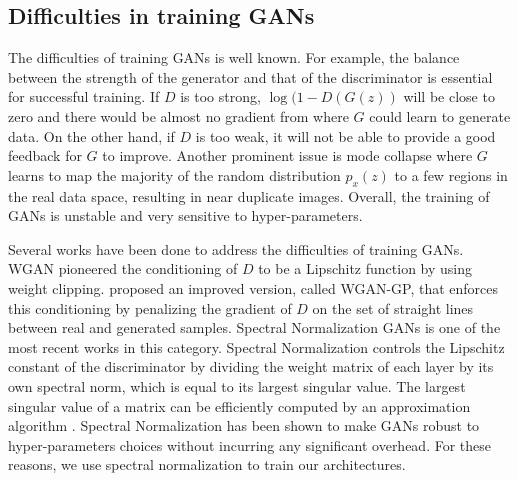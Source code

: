 \documentclass{article} %
\begin{document}
\subsection{Difficulties in training GANs}
The difficulties of training GANs is well known. For example, the balance between the strength of the generator and that of the discriminator is essential for successful training. If $D$ is too strong, $\log{(1-D(G(z))}$ will be close to zero and there would be almost no gradient from where $G$ could learn to generate data. On the other hand, if $D$ is too weak, it will not be able to provide a good feedback for $G$ to improve. Another prominent issue is mode collapse where $G$ learns to map the majority of the random distribution $p_{x}(z)$ to a few regions in the real data space, resulting in near duplicate images. Overall, the training of GANs is unstable and very sensitive to hyper-parameters. \par
Several works have been done to address the difficulties of training GANs. WGAN \citep{arjovsky2017wasserstein} pioneered the conditioning of $D$ to be a Lipschitz function by using weight clipping. \cite{danihelka2017comparison} proposed an improved version, called WGAN-GP, that enforces this conditioning by penalizing the gradient of $D$ on the set of straight lines between real and generated samples. Spectral Normalization GANs \citep{miyato2017spectral} is one of the most recent works in this category. Spectral Normalization controls the Lipschitz constant of the discriminator by dividing the weight matrix of each layer by its own spectral norm, which is equal to its largest singular value. The largest singular value of a matrix can be efficiently computed by an approximation algorithm \citep{miyato2017spectral}. Spectral Normalization has been shown to make GANs robust to hyper-parameters choices without incurring any significant overhead. For these reasons, we use spectral normalization to train our architectures.
\end{document}
